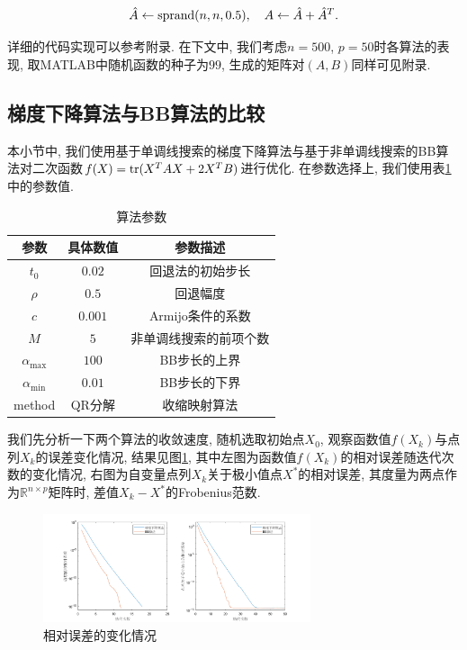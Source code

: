 \documentclass[UTF8]{ctexart}
\begin{document}
\[\hat{A}\leftarrow \textup{sprand}(n,n,0.5),\quad A\leftarrow \hat{A}+\hat{A}^T.\]

详细的代码实现可以参考附录. 在下文中, 我们考虑$n=500$, $p=50$时各算法的表现, 取MATLAB中随机函数的种子为$99$, 生成的矩阵对$(A,B)$同样可见附录.

\subsection{梯度下降算法与BB算法的比较}

本小节中, 我们使用基于单调线搜索的梯度下降算法与基于非单调线搜索的BB算法对二次函数$f(X)=\textup{tr}(X^T AX+2X^T B)$进行优化. 在参数选择上, 我们使用表\ref{tab1}中的参数值. 

\begin{table}[htb]
    \centering
    \begin{tabular}{c|cc}
        \hline
        \hline
        参数 & 具体数值 & 参数描述\\
        \hline
        $t_0$ & $0.02$ & 回退法的初始步长\\
        $\rho$ & $0.5$ & 回退幅度\\
        $c$ & $0.001$ & Armijo条件的系数\\
        $M$ & $5$ & 非单调线搜索的前项个数\\
        $\alpha_{\max}$ & $100$ & BB步长的上界\\
        $\alpha_{\min}$ & $0.01$ & BB步长的下界\\
        method & QR分解 & 收缩映射算法\\
        \hline
        \hline
    \end{tabular}
    \caption{算法参数}\label{tab1}
\end{table}

我们先分析一下两个算法的收敛速度, 随机选取初始点$X_0$, 观察函数值$f(X_k)$与点列$X_k$的误差变化情况, 结果见图\ref{fig1}, 其中左图为函数值$f(X_k)$的相对误差随迭代次数的变化情况, 右图为自变量点列$X_k$关于极小值点$X^*$的相对误差, 其度量为两点作为$\mathbb{R}^{n\times p}$矩阵时, 差值$X_k-X^*$的Frobenius范数. 

\begin{figure}[htb]
    \centering
    \includegraphics[width=0.7\textwidth]{Q2-figure/1.png}
    \caption{相对误差的变化情况}\label{fig1}
\end{figure}
\end{document}
